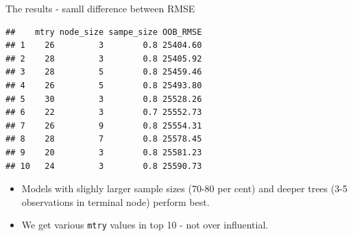 \documentclass[
  10pt,
  ignorenonframetext,
]{beamer}
\newenvironment{Shaded}{}{}
\newcommand{\DecValTok}[1]{#1}
\newcommand{\KeywordTok}[1]{\textcolor[rgb]{0.00,0.00,1.00}{#1}}
\newcommand{\NormalTok}[1]{#1}
\newcommand{\OperatorTok}[1]{#1}
\newcommand{\StringTok}[1]{\textcolor[rgb]{0.00,0.50,0.50}{#1}}
\providecommand{\tightlist}{%
  \setlength{\itemsep}{0pt}\setlength{\parskip}{0pt}}
\begin{document}
\begin{frame}[fragile]{The results - samll difference between RMSE}
\protect\hypertarget{the-results---samll-difference-between-rmse}{}

\begin{Shaded}
\end{Shaded}

\begin{verbatim}
##    mtry node_size sampe_size OOB_RMSE
## 1    26         3        0.8 25404.60
## 2    28         3        0.8 25405.92
## 3    28         5        0.8 25459.46
## 4    26         5        0.8 25493.80
## 5    30         3        0.8 25528.26
## 6    22         3        0.7 25552.73
## 7    26         9        0.8 25554.31
## 8    28         7        0.8 25578.45
## 9    20         3        0.8 25581.23
## 10   24         3        0.8 25590.73
\end{verbatim}

\begin{itemize}
\tightlist
\item
  Models with slighly larger sample sizes (70-80 per cent) and deeper
  trees (3-5 observations in terminal node) perform best.
\item
  We get various \texttt{mtry} values in top 10 - not over influential. 
\end{itemize}

\end{frame}
\end{document}
